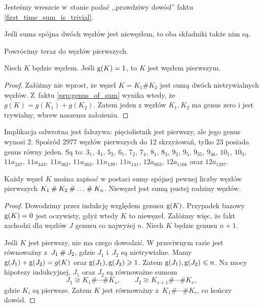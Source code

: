 Jesteśmy wreszcie w~stanie podać ,,prawdziwy dowód'' faktu \ref{first_time_sum_is_trivial}.

\begin{corollary}
\label{cor:connected_sum_no_inverses}%
    Jeśli suma spójna dwóch węzłów jest niewęzłem, to oba składniki także nim są.
\end{corollary}

Powrócimy teraz do węzłów pierwszych.
%

\begin{proposition}
    Niech $K$ będzie węzłem.
    Jeśli $\operatorname{g} (K) = 1$, to $K$ jest węzłem pierwszym.
\end{proposition}

\begin{proof}
    Załóżmy nie wprost, że węzeł $K = K_1 \# K_2$ jest sumą dwóch nietrywialnych węzłów.
    Z~faktu \ref{prp:genus_of_sum} wynika wtedy, że $g(K) = g(K_1) + g(K_2)$.
    Zatem jeden z węzłów $K_1, K_2$ ma genus zero i jest trywialny, wbrew naszemu założeniu.
\end{proof}

Implikacja odwrotna jest fałszywa: pięciolistnik jest pierwszy, ale jego genus wynosi $2$.
Spośród 2977 węzłów pierwszych do 12 skrzyżowań, tylko 23 posiada genus równy jeden.
Są to: $3_{1}$, $4_{1}$, $5_{2}$, $6_{1}$, $7_{2}$, $7_{4}$, $8_{1}$, $8_{3}$, $9_{2}$, $9_{5}$, $9_{35}$, $9_{46}$, $10_{1}$, $10_{3}$, $11a_{247}$, $11a_{343}$, $11a_{362}$, $11a_{363}$, $11n_{139}$, $11n_{141}$, $12a_{803}$, $12a_{1166}$ oraz $12a_{1287}$.

\begin{proposition}
\label{prp:knots_decompose_into_primes}%
    Każdy węzeł $K$ można zapisać w postaci sumy spójnej pewnej liczby węzłów pierwszych $K_1 \mathbin{\#} K_2 \mathbin{\#} \ldots \mathbin{\#} K_n$.
    Niewęzeł jest sumą pustej rodziny węzłów.
\end{proposition}

\begin{proof}
    Dowodzimy przez indukcję względem genusu $\operatorname{g} (K)$.
    Przypadek bazowy $\operatorname{g} (K) = 0$ jest oczywisty, gdyż wtedy $K$ to niewęzeł.
    Załóżmy więc, że fakt zachodzi dla węzłów $J$ genusu co najwyżej $n$.
    Niech $K$ będzie genusu $n + 1$.

    Jeśli $K$ jest pierwszy, nie ma czego dowodzić.
    W przeciwnym razie jest równoważny z~$J_1 \mathbin{\#} J_2$, gdzie $J_1$ i~$J_2$ są nietrywialne.
    Mamy $\operatorname{g} (J_1) + \operatorname{g} (J_2) = g(K)$ oraz $\operatorname{g}(J_1), \operatorname{g}(J_2) \geqslant 1$.
    Zatem $\operatorname{g}(J_1), \operatorname{g}(J_2) \leqslant n$.
    Na mocy hipotezy indukcyjnej, $J_1$ oraz $J_2$ są równoważne sumom
    \[
        J_1 \cong K_1 \# \cdots \# K_s, \qquad
        J_2 \cong K_{s+1} \# \cdots \# K_r,
    \]
    gdzie $K_i$ są pierwsze.
    Zatem $K$ jest równoważny z~$K_1\#\cdots\# K_r$, co kończy dowód.
\end{proof}

